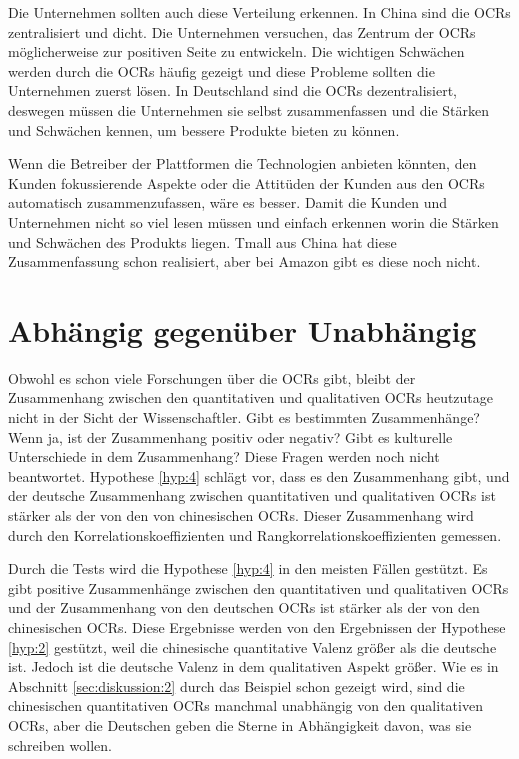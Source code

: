 Die Unternehmen sollten auch diese Verteilung erkennen. In China sind die \ac{OCRs} zentralisiert und dicht. Die Unternehmen versuchen, das Zentrum der \ac{OCRs} möglicherweise zur positiven Seite zu entwickeln. Die wichtigen Schwächen werden durch die \ac{OCRs} häufig gezeigt und diese Probleme sollten die Unternehmen zuerst lösen. In Deutschland sind die \ac{OCRs} dezentralisiert, deswegen müssen die Unternehmen sie selbst zusammenfassen und die Stärken und Schwächen kennen, um bessere Produkte bieten zu können.

Wenn die Betreiber der Plattformen die Technologien anbieten könnten, den Kunden fokussierende Aspekte oder die Attitüden der Kunden aus den \ac{OCRs} automatisch zusammenzufassen, wäre es besser. Damit die Kunden und Unternehmen nicht so viel lesen müssen und einfach erkennen worin die Stärken und Schwächen des Produkts liegen. Tmall aus China hat diese Zusammenfassung schon realisiert, aber bei Amazon gibt es diese noch nicht.
\section{Abhängig gegenüber Unabhängig}
Obwohl es schon viele Forschungen über die \ac{OCRs} gibt, bleibt der Zusammenhang zwischen den quantitativen und qualitativen \ac{OCRs} heutzutage nicht in der Sicht der Wissenschaftler. Gibt es bestimmten Zusammenhänge? Wenn ja, ist der Zusammenhang positiv oder negativ? Gibt es kulturelle Unterschiede in dem Zusammenhang? Diese Fragen werden noch nicht beantwortet. Hypothese \ref{hyp:4} schlägt vor, dass es den Zusammenhang gibt, und der deutsche Zusammenhang zwischen quantitativen und qualitativen \ac{OCRs} ist stärker als der von den von chinesischen \ac{OCRs}. Dieser Zusammenhang wird durch den Korrelationskoeffizienten und Rangkorrelationskoeffizienten gemessen.

Durch die Tests wird die Hypothese \ref{hyp:4} in den meisten Fällen gestützt. Es gibt positive Zusammenhänge zwischen den quantitativen und qualitativen \ac{OCRs} und der Zusammenhang von den deutschen \ac{OCRs} ist stärker als der von den chinesischen \ac{OCRs}. Diese Ergebnisse werden von den Ergebnissen der Hypothese \ref{hyp:2} gestützt, weil die chinesische quantitative Valenz größer als die deutsche ist. Jedoch ist die deutsche Valenz in dem qualitativen Aspekt größer. Wie es in Abschnitt \ref{sec:diskussion:2} durch das Beispiel schon gezeigt wird, sind die chinesischen quantitativen \ac{OCRs} manchmal unabhängig von den qualitativen \ac{OCRs}, aber die Deutschen geben die Sterne in Abhängigkeit davon, was sie schreiben wollen.

